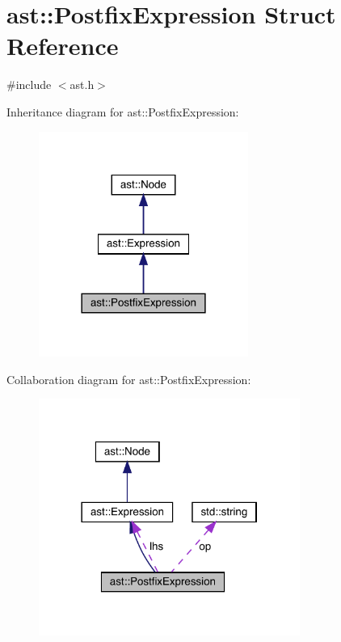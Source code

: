 \hypertarget{structast_1_1_postfix_expression}{}\section{ast\+:\+:Postfix\+Expression Struct Reference}
\label{structast_1_1_postfix_expression}


{\ttfamily \#include $<$ast.\+h$>$}



Inheritance diagram for ast\+:\+:Postfix\+Expression\+:\nopagebreak
\begin{figure}[H]
\begin{center}
\leavevmode
\includegraphics[width=194pt]{structast_1_1_postfix_expression__inherit__graph}
\end{center}
\end{figure}


Collaboration diagram for ast\+:\+:Postfix\+Expression\+:\nopagebreak
\begin{figure}[H]
\begin{center}
\leavevmode
\includegraphics[width=242pt]{structast_1_1_postfix_expression__coll__graph}
\end{center}
\end{figure}
